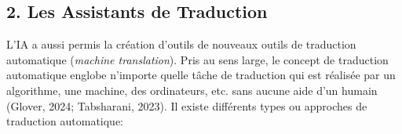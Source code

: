 \documentclass[
  letterpaper,
  DIV=11,
  numbers=noendperiod]{scrreprt}
\newenvironment{Shaded}{\begin{snugshade}}{\end{snugshade}}
\newcommand{\AttributeTok}[1]{\textcolor[rgb]{0.40,0.45,0.13}{#1}}
\newcommand{\CommentTok}[1]{\textcolor[rgb]{0.37,0.37,0.37}{#1}}
\newcommand{\FunctionTok}[1]{\textcolor[rgb]{0.28,0.35,0.67}{#1}}
\newcommand{\NormalTok}[1]{\textcolor[rgb]{0.00,0.23,0.31}{#1}}
\newcommand{\OtherTok}[1]{\textcolor[rgb]{0.00,0.23,0.31}{#1}}
\newcommand{\SpecialCharTok}[1]{\textcolor[rgb]{0.37,0.37,0.37}{#1}}
\newcommand{\StringTok}[1]{\textcolor[rgb]{0.13,0.47,0.30}{#1}}
\begin{document}
\begin{Shaded}
\end{Shaded}

\subsection{2. Les Assistants de
Traduction}\label{les-assistants-de-traduction}

L'IA a aussi permis la création d'outils de nouveaux outils de
traduction automatique (\emph{machine translation}). Pris au sens large,
le concept de traduction automatique englobe n'importe quelle tâche de
traduction qui est réalisée par un algorithme, une machine, des
ordinateurs, etc. sans aucune aide d'un humain (Glover, 2024;
Tabsharani, 2023). Il existe différents types ou approches de traduction
automatique:
\end{document}

